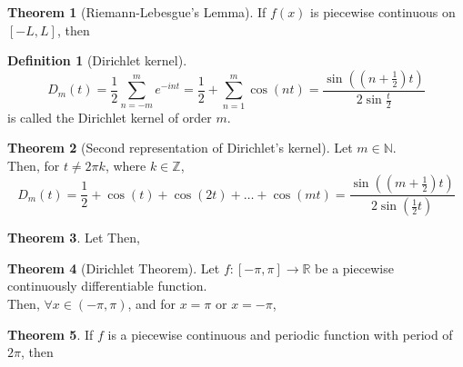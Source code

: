 \documentclass[fleqn, 8pt]{amsart}
\theoremstyle{definition}
\newtheorem{definition}{Definition}
\theoremstyle{theorem}
\newtheorem{theorem}{Theorem}
\begin{document}
\begin{multicols}{2}
\begin{spacing}{0.7}
\begin{theorem}[Riemann-Lebesgue's Lemma]
	If $f(x)$ is piecewise continuous on $[-L,L]$, then
	\label{Riemann-Lebesgue's_Lemma}
\end{theorem}

\begin{definition}[Dirichlet kernel]
	\begin{equation*}
		D_m(t)  = \frac{1}{2} \sum\limits_{n = -m}^{m} e^{-i n t}
                        = \frac{1}{2} + \sum\limits_{n = 1}^{m} \cos(n t)
                        = \frac{\sin\left( \left( n + \frac{1}{2} \right) t \right)}{2 \sin \frac{t}{2}}
	\end{equation*}
	is called the Dirichlet kernel of order $m$.
\end{definition}

\begin{theorem}[Second representation of Dirichlet's kernel]
	Let $m \in \mathbb{N}$.\\
	Then, for $t \neq 2 \pi k$, where $k \in \mathbb{Z}$,
	\begin{equation*}
		D_m(t) = \frac{1}{2} + \cos(t) + \cos(2 t) + \dots + \cos(m t) = \frac{\sin\left( \left( m + \frac{1}{2} \right) t \right)}{2 \sin\left( \frac{1}{2} t \right)}
	\end{equation*}
\end{theorem}

\begin{theorem}
	Let
	Then,
\end{theorem}

\begin{theorem}[Dirichlet Theorem]
	Let $f : [-\pi,\pi] \to \mathbb{R}$ be a piecewise continuously differentiable function.\\
	Then, $\forall x \in (-\pi,\pi)$,
	and for $x = \pi$ or $x = -\pi$,
	\label{Dirichlet_Theorem}
\end{theorem}

\begin{theorem}
	If $f$ is a piecewise continuous and periodic function with period of $2 \pi$, then
\end{theorem}


\end{spacing}
\end{multicols}
\end{document}

